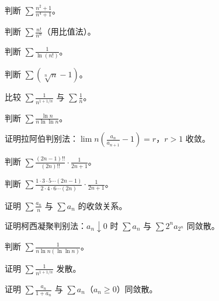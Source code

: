 \begin{exercise}[3] 判断 \(\sum\frac{n^2+1}{n^4+1}\)。\end{exercise}
\begin{exercise}[4] 判断 \(\sum\frac{n!}{n^n}\)（用比值法）。\end{exercise}
\begin{exercise}[4] 判断 \(\sum\frac{1}{\ln(n!)}\)。\end{exercise}
\begin{exercise}[4] 判断 \(\sum(\sqrt[n]{n}-1)\)。\end{exercise}
\begin{exercise}[4] 比较 \(\sum\frac{1}{n^{1+1/n}}\) 与 \(\sum\frac1n\)。\end{exercise}
\begin{exercise}[4] 判断 \(\sum\frac{\ln n}{n\ln\ln n}\)。\end{exercise}
\begin{exercise}[5] 证明拉阿伯判别法：\(\lim n(\frac{a_n}{a_{n+1}}-1)=r\)，\(r>1\) 收敛。\end{exercise}
\begin{exercise}[5] 判断 \(\sum\frac{(2n-1)!!}{(2n)!!}\cdot\frac1{2n+1}\)。\end{exercise}
\begin{exercise}[5] 判断 \(\sum\frac{1\cdot3\cdot5\cdots(2n-1)}{2\cdot4\cdot6\cdots(2n)}\cdot\frac1{2n+1}\)。\end{exercise}
\begin{exercise}[5] 证明 \(\sum\frac{a_n}{n}\) 与 \(\sum a_n\) 的收敛关系。\end{exercise}
\begin{exercise}[6] 证明柯西凝聚判别法：\(a_n\downarrow0\) 时 \(\sum a_n\) 与 \(\sum 2^n a_{2^n}\) 同敛散。\end{exercise}
\begin{exercise}[6] 判断 \(\sum\frac{1}{n\ln n(\ln\ln n)}\)。\end{exercise}
\begin{exercise}[6] 证明 \(\sum\frac{1}{n^{1+1/n}}\) 发散。\end{exercise}
\begin{exercise}[7] 证明 \(\sum\frac{a_n}{1+a_n}\) 与 \(\sum a_n\)（\(a_n\ge0\)）同敛散。\end{exercise}
